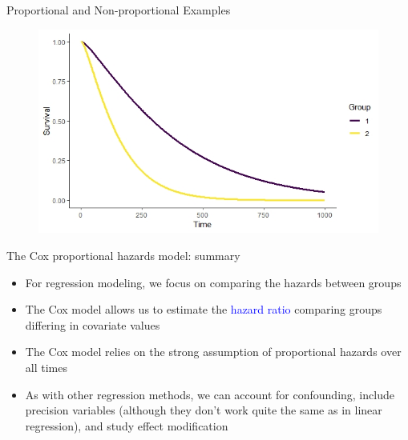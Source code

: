 \documentclass[10pt,t]{beamer}
\begin{document}
\begin{frame}{Proportional and Non-proportional Examples}
\begin{figure}
		\includegraphics[scale = 0.15]{figs/prop_survival_2}
	\end{figure}
	
\end{frame}

\begin{frame}{The Cox proportional hazards model: summary}
	\begin{itemize}
		\item For regression modeling, we focus on comparing the hazards between groups
		
		\medskip
		
		\item The Cox model allows us to estimate the \textcolor{blue}{hazard ratio} comparing groups differing in covariate values
		
		\medskip
		
		\item The Cox model relies on the strong assumption of proportional hazards over all times
		
		\medskip
		
		\item As with other regression methods, we can account for confounding, include precision variables (although they don't work quite the same as in linear regression), and study effect modification
	\end{itemize}
\end{frame}
\end{document}

